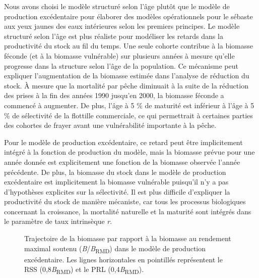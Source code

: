 \documentclass[11pt]{book}
\begin{document}
Nous avons choisi le modèle structuré selon l'âge plutôt que le modèle de production excédentaire pour élaborer des modèles opérationnels pour le sébaste aux yeux jaunes des eaux intérieures selon les premiers principes. Le modèle structuré selon l'âge est plus réaliste pour modéliser les retards dans la productivité du stock au fil du temps. Une seule cohorte contribue à la biomasse féconde (et à la biomasse vulnérable) sur plusieurs années à mesure qu'elle progresse dans la structure selon l'âge de la population. Ce mécanisme peut expliquer l'augmentation de la biomasse estimée dans l'analyse de réduction du stock. À mesure que la mortalité par pêche diminuait à la suite de la réduction des prises à la fin des années 1990 jusqu'en 2000, la biomasse féconde a commencé à augmenter. De plus, l'âge à 5 \% de maturité est inférieur à l'âge à 5 \% de sélectivité de la flottille commerciale, ce qui permettrait à certaines parties des cohortes de frayer avant une vulnérabilité importante à la pêche.

Pour le modèle de production excédentaire, ce retard peut être implicitement intégré à la fonction de production du modèle, mais la biomasse prévue pour une année donnée est explicitement une fonction de la biomasse observée l'année précédente. De plus, la biomasse du stock dans le modèle de production excédentaire est implicitement la biomasse vulnérable puisqu'il n'y a pas d'hypothèses explicites sur la sélectivité. Il est plus difficile d'expliquer la productivité du stock de manière mécaniste, car tous les processus biologiques concernant la croissance, la mortalité naturelle et la maturité sont intégrés dans le paramètre de taux intrinsèque \emph{r}.


\begin{figure}[htb]

{\centering {} 

}

\caption{Trajectoire de la biomasse par rapport à la biomasse au rendement maximal soutenu (\emph{B}/\emph{B}\textsubscript{RMD}) dans le modèle de production excédentaire. Les lignes horizontales en pointillés représentent le RSS (0,8\emph{B}\textsubscript{RMD}) et le PRL (0,4\emph{B}\textsubscript{RMD}).}\label{fig:spm-biomass}
\end{figure}
\end{document}
